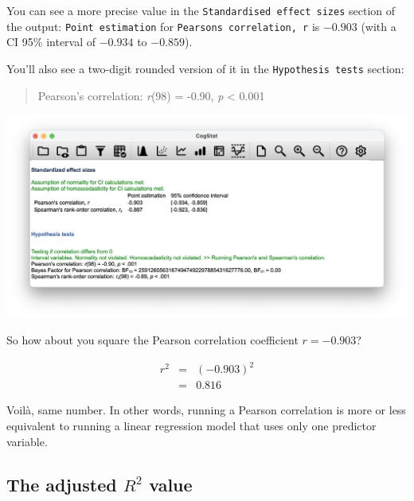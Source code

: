\documentclass[
]{book}
\theoremstyle{definition}
\theoremstyle{definition}
\theoremstyle{definition}
\theoremstyle{definition}
\theoremstyle{remark}
\begin{document}
You can see a more precise value in the \texttt{Standardised\ effect\ sizes} section of the output: \texttt{Point\ estimation} for \texttt{Pearson\textquotesingle{}s\ correlation,\ r} is \(-0.903\) (with a CI 95\% interval of \(-0.934\) to \(-0.859\)).

You'll also see a two-digit rounded version of it in the \texttt{Hypothesis\ tests} section:

\begin{quote}
Pearson's correlation: \emph{r}(98) = -0.90, \emph{p} \textless{} 0.001
\end{quote}

\begin{center}\includegraphics[width=0.66\linewidth]{resources/image/cogstatrvsrsqrd} \end{center}

So how about you square the Pearson correlation coefficient \(r = -0.903\)?

\[
\begin{array}{rcl}
r^2 &=& (-0.903)^2
    \\
    &=& 0.816
\end{array}
\]

Voilà, same number. In other words, running a Pearson correlation is more or less equivalent to running a linear regression model that uses only one predictor variable.

\hypertarget{the-adjusted-r2-value}{%
\subsection{\texorpdfstring{The adjusted \(R^2\) value}{The adjusted R\^{}2 value}}\label{the-adjusted-r2-value}}
\end{document}
